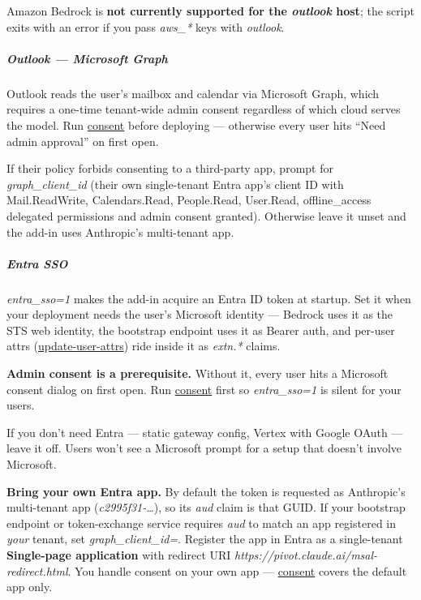 \documentclass[11pt]{article}
\begin{document}
Amazon Bedrock is \textbf{not currently supported for the \emph{outlook} host}; the script exits with an error if you pass \emph{aws\_\allowbreak{}*} keys with \emph{outlook}.


\subparagraph{Outlook — Microsoft Graph}\mbox{}\par

Outlook reads the user's mailbox and calendar via Microsoft Graph, which requires a one-time tenant-wide admin consent regardless of which cloud serves the model. Run \href{consent.md\#outlook--microsoft-graph-consent}{consent} before deploying — otherwise every user hits ``Need admin approval'' on first open.


If their policy forbids consenting to a third-party app, prompt for \emph{graph\_\allowbreak{}client\_\allowbreak{}id} (their own single-tenant Entra app's client ID with Mail.ReadWrite, Calendars.Read, People.Read, User.Read, offline\_\allowbreak{}access delegated permissions and admin consent granted). Otherwise leave it unset and the add-in uses Anthropic's multi-tenant app.


\subparagraph{Entra SSO}\mbox{}\par

\emph{entra\_\allowbreak{}sso=1} makes the add-in acquire an Entra ID token at startup. Set it when your deployment needs the user's Microsoft identity — Bedrock uses it as the STS web identity, the bootstrap endpoint uses it as Bearer auth, and per-user attrs (\href{update-user-attrs.md}{update-user-attrs}) ride inside it as \emph{extn.*} claims.


\textbf{Admin consent is a prerequisite.} Without it, every user hits a Microsoft consent dialog on first open. Run \href{consent.md}{consent} first so \emph{entra\_\allowbreak{}sso=1} is silent for your users.


If you don't need Entra — static gateway config, Vertex with Google OAuth — leave it off. Users won't see a Microsoft prompt for a setup that doesn't involve Microsoft.


\textbf{Bring your own Entra app.} By default the token is requested as Anthropic's multi-tenant app (\emph{c2995f31-…}), so its \emph{aud} claim is that GUID. If your bootstrap endpoint or token-exchange service requires \emph{aud} to match an app registered in \emph{your} tenant, set \emph{graph\_\allowbreak{}client\_\allowbreak{}id=}. Register the app in Entra as a single-tenant \textbf{Single-page application} with redirect URI \emph{https://pivot.claude.ai/msal-redirect.html}. You handle consent on your own app — \href{consent.md}{consent} covers the default app only.
\end{document}
